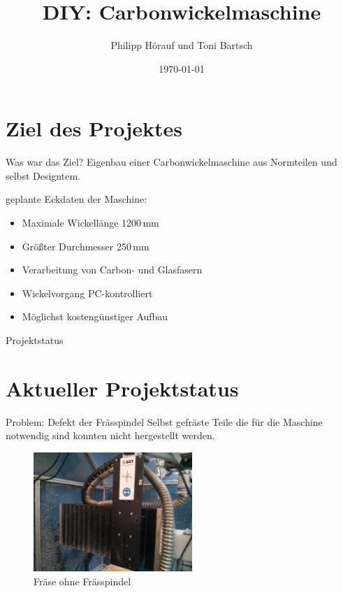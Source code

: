 \documentclass[12pt]{beamer}
\author{Philipp Hörauf und Toni Bartsch}
\title{DIY: Carbonwickelmaschine}
\date{\today}
\begin{document}
\begin{frame}
\titlepage
\end{frame}


\begin{frame}
\tableofcontents
\end{frame}

\section{Ziel des Projektes}
\begin{frame}{Was war das Ziel?}
Eigenbau einer Carbonwickelmaschine aus Normteilen und selbst Designtem.\newline
\vspace{0.5cm}


geplante Eckdaten der Maschine:
\begin{itemize}
	\item Maximale Wickellänge 1200\,mm
	\item Größter Durchmesser 250\,mm
	\item Verarbeitung von Carbon- und Glasfasern
	\item Wickelvorgang PC-kontrolliert
	\item Möglichst kostengünstiger Aufbau
\end{itemize}

\end{frame}


\begin{frame}{Projektstatus}
\section{Aktueller Projektstatus}
Problem: Defekt der Frässpindel\newline
Selbst gefräste Teile die für die Maschine notwendig sind konnten nicht hergestellt werden.

\begin{figure}
	\includegraphics[width=6cm]{bilder/fraese_defekt.jpg}
	\caption{Fräse ohne Frässpindel}
\end{figure}

\end{frame}
\end{document}
